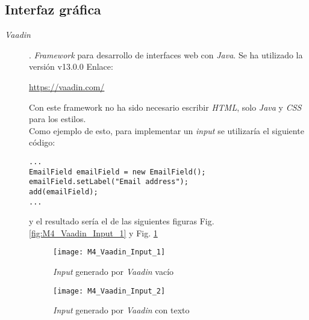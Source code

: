 \subsection{Interfaz gráfica}
\begin{description}
	\item[\textit{Vaadin}]. \textit{Framework} para desarrollo de interfaces web con \textit{Java}.
		Se ha utilizado la versión  v13.0.0 Enlace:
		
		\url{https://vaadin.com/}
		
		Con este framework no ha sido necesario escribir \textit{HTML}, solo \textit{Java} y \textit{CSS} para los estilos. 
		\\Como ejemplo de esto, para implementar un \textit{input} se utilizaría el siguiente código:
		
\begin{minipage}{\linewidth}
\tiny \begin{verbatim}
...
EmailField emailField = new EmailField();
emailField.setLabel("Email address");
add(emailField);
...
\end{verbatim}
\end{minipage}	

		y el resultado sería el de las siguientes figuras Fig. \ref{fig:M4_Vaadin_Input_1} y Fig. \ref{fig:M4_Vaadin_Input_2}
\begin{figure}[!h]
	\centering
	\texttt{[image: M4\_Vaadin\_Input\_1]}
	\caption{\textit{Input} generado por \textit{Vaadin} vacío}\label{fig:M4_Vaadin_Input_1}
	
	
	\texttt{[image: M4\_Vaadin\_Input\_2]}
	\caption{\textit{Input} generado por \textit{Vaadin} con texto}\label{fig:M4_Vaadin_Input_2}
\end{figure}
\FloatBarrier

\end{description}
